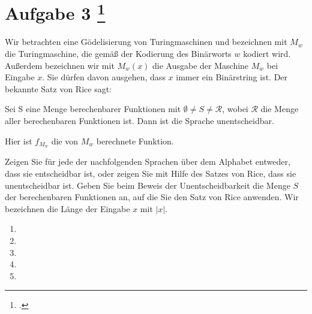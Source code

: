 \documentclass{lehramt-informatik-aufgabe}
\begin{document}
\liAufgabenTitel{}
\section{Aufgabe 3
\footcite{66115:2021:03}}

Wir betrachten eine Gödelisierung von Turingmaschinen und bezeichnen mit
$M_w$ die Turingmaschine, die gemäß der Kodierung des Binärworts $w$
kodiert wird. Außerdem bezeichnen wir mit $M_w(x)$ die Ausgabe der
Maschine $M_w$ bei Eingabe $x$. Sie dürfen davon ausgehen, dass $x$
immer ein Binärstring ist. Der bekannte Satz von Rice sagt:

Sei S eine Menge berechenbarer Funktionen mit $\emptyset \neq S \neq
\mathcal{R}$, wobei $\mathcal{R}$ die Menge aller berechenbaren
Funktionen ist. Dann ist die Sprache 
unentscheidbar.

Hier ist $f_{M_w}$ die von $M_w$ berechnete Funktion.

Zeigen Sie für jede der nachfolgenden Sprachen über dem Alphabet
 entweder, dass sie entscheidbar ist, oder zeigen Sie mit
Hilfe des Satzes von Rice, dass sie unentscheidbar ist. Geben Sie beim
Beweis der Unentscheidbarkeit die Menge $S$ der berechenbaren Funktionen
an, auf die Sie den Satz von Rice anwenden. Wir bezeichnen die Länge der
Eingabe $x$ mit $|x|$.

\begin{enumerate}


\item {}


\item {}


\item {}


\item {}


\item {}

\end{enumerate}
\end{document}
